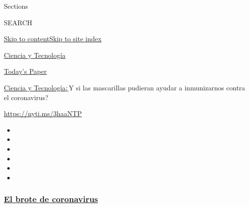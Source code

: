 Sections

SEARCH

\protect\hyperlink{site-content}{Skip to
content}\protect\hyperlink{site-index}{Skip to site index}

\href{https://www.nytimes3xbfgragh.onion/es/section/ciencia-y-tecnologia}{Ciencia
y Tecnología}

\href{https://myaccount.nytimes3xbfgragh.onion/auth/login?response_type=cookie\&client_id=vi}{}

\href{https://www.nytimes3xbfgragh.onion/section/todayspaper}{Today's
Paper}

\href{/es/section/ciencia-y-tecnologia}{Ciencia y
Tecnología}\textbar{}¿Y si las mascarillas pudieran ayudar a
inmunizarnos contra el coronavirus?

\url{https://nyti.ms/3haaNTP}

\begin{itemize}
\item
\item
\item
\item
\item
\item
\end{itemize}

\hypertarget{el-brote-de-coronavirus}{%
\subsubsection{\texorpdfstring{\href{https://www.nytimes3xbfgragh.onion/es/spotlight/coronavirus?name=styln-coronavirus-es\&region=TOP_BANNER\&block=storyline_menu_recirc\&action=click\&pgtype=Article\&impression_id=cf6dbb70-f52d-11ea-bb28-3d3dfc9ceefd\&variant=undefined}{El
brote de
coronavirus}}{El brote de coronavirus}}\label{el-brote-de-coronavirus}}

